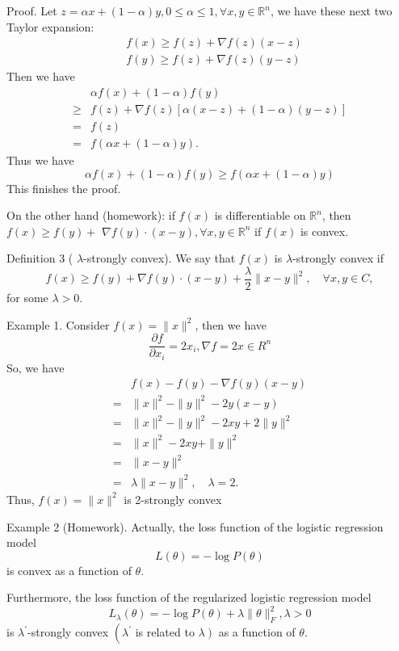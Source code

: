 \documentclass[10pt]{article}
\begin{document}
Proof. Let $z=\alpha x+(1-\alpha) y, 0 \leq \alpha \leq 1, \forall x, y \in \mathbb{R}^{n}$, we have these next two Taylor expansion:
$$
\begin{aligned}
&f(x) \geq f(z)+\nabla f(z)(x-z) \\
&f(y) \geq f(z)+\nabla f(z)(y-z)
\end{aligned}
$$
Then we have
$$
\begin{aligned}
& \alpha f(x)+(1-\alpha) f(y) \\
\geq & f(z)+\nabla f(z)[\alpha(x-z)+(1-\alpha)(y-z)] \\
=& f(z) \\
=& f(\alpha x+(1-\alpha) y) .
\end{aligned}
$$
Thus we have
$$
\alpha f(x)+(1-\alpha) f(y) \geq f(\alpha x+(1-\alpha) y)
$$
This finishes the proof.

On the other hand (homework): if $f(x)$ is differentiable on $\mathbb{R}^{n}$, then $f(x) \geq f(y)+$ $\nabla f(y) \cdot(x-y), \forall x, y \in \mathbb{R}^{n}$ if $f(x)$ is convex.

Definition 3 ( $\lambda$-strongly convex). We say that $f(x)$ is $\lambda$-strongly convex if
$$
f(x) \geq f(y)+\nabla f(y) \cdot(x-y)+\frac{\lambda}{2}\|x-y\|^{2}, \quad \forall x, y \in C,
$$
for some $\lambda>0$.

Example 1. Consider $f(x)=\|x\|^{2}$, then we have
$$
\frac{\partial f}{\partial x_{i}}=2 x_{i}, \nabla f=2 x \in R^{n}
$$
So, we have
$$
\begin{aligned}
& f(x)-f(y)-\nabla f(y)(x-y) \\
=&\|x\|^{2}-\|y\|^{2}-2 y(x-y) \\
=&\|x\|^{2}-\|y\|^{2}-2 x y+2\|y\|^{2} \\
=&\|x\|^{2}-2 x y+\|y\|^{2} \\
=&\|x-y\|^{2} \\
=& \lambda\|x-y\|^{2}, \quad \lambda=2 .
\end{aligned}
$$
Thus, $f(x)=\|x\|^{2}$ is 2-strongly convex

Example 2 (Homework). Actually, the loss function of the logistic regression model
$$
L(\theta)=-\log P(\theta)
$$
is convex as a function of $\theta$.

Furthermore, the loss function of the regularized logistic regression model
$$
L_{\lambda}(\theta)=-\log P(\theta)+\lambda\|\theta\|_{F}^{2}, \lambda>0
$$
is $\lambda^{\prime}$-strongly convex $\left(\lambda^{\prime}\right.$ is related to $\left.\lambda\right)$ as a function of $\theta$.
\end{document}
